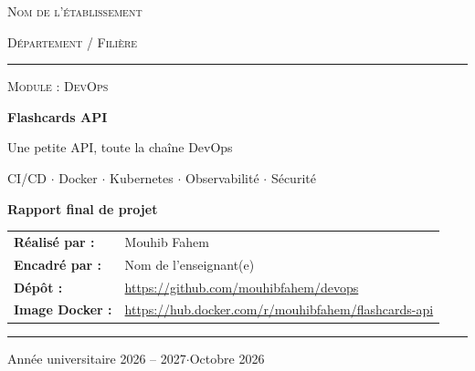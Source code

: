 \documentclass[11pt,a4paper]{article}
\newcommand{\etablissement}{Nom de l'établissement}
\newcommand{\departement}{Département / Filière}
\newcommand{\module}{DevOps}
\newcommand{\etudiant}{Mouhib Fahem}
\newcommand{\enseignant}{Nom de l'enseignant(e)}
\newcommand{\annee}{2026 -- 2027}
\newcommand{\daterendu}{Octobre 2026}
\begin{document}
\begin{titlepage}
  \centering
  {\large\scshape \etablissement\par}
  \vspace{0.2cm}
  {\scshape \departement\par}
  \vspace{0.3cm}
  \textcolor{accent}{\rule{0.85\linewidth}{0.8pt}}\par
  \vspace{3.2cm}

  {\normalsize\scshape\color{muted} Module : \module\par}
  \vspace{0.6cm}
  {\Huge\bfseries Flashcards API\par}
  \vspace{0.4cm}
  {\Large Une petite API, toute la chaîne DevOps\par}
  \vspace{0.3cm}
  {\large\color{muted} CI/CD $\cdot$ Docker $\cdot$ Kubernetes $\cdot$ Observabilité $\cdot$ Sécurité\par}
  \vspace{1.2cm}
  {\Large\bfseries Rapport final de projet\par}

  \vspace{2.6cm}

  \vfill
  \begin{tabular}{@{}ll@{}}
    \textbf{Réalisé par :} & \etudiant \\[0.15cm]
    \textbf{Encadré par :} & \enseignant \\[0.15cm]
    \textbf{Dépôt :} & \url{https://github.com/mouhibfahem/devops} \\[0.15cm]
    \textbf{Image Docker :} & \url{https://hub.docker.com/r/mouhibfahem/flashcards-api} \\
  \end{tabular}

  \vspace{1.2cm}
  \textcolor{accent}{\rule{0.85\linewidth}{0.8pt}}\par
  \vspace{0.2cm}
  {\large Année universitaire \annee \quad$\cdot$\quad \daterendu\par}
\end{titlepage}
\end{document}
